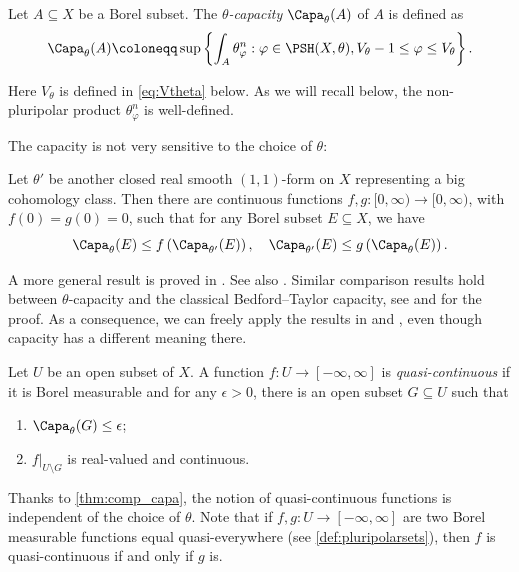 \begin{definition}\label{def:cap}
    Let $A\subseteq X$ be a Borel subset. The \emph{$\theta$-capacity} $\Capa_{\theta}(A)$\index{$\Capa_{\theta}$} of $A$ is defined as
    \[
    \Capa_{\theta}(A)\coloneqq \sup\left\{ \int_A\theta_{\varphi}^n : \varphi\in \PSH(X,\theta),V_{\theta}-1\leq \varphi\leq V_{\theta} \right\}.
    \]
\end{definition}
Here $V_{\theta}$ is defined in \eqref{eq:Vtheta} below. As we will recall below, the non-pluripolar product $\theta_{\varphi}^n$ is well-defined.

The capacity is not very sensitive to the choice of $\theta$:
\begin{theorem}\label{thm:comp_capa}
    Let $\theta'$ be another closed real smooth $(1,1)$-form on $X$ representing a big cohomology class. Then there are continuous functions $f,g\colon [0,\infty)\rightarrow [0,\infty)$, with $f(0)=g(0)=0$, such that for any Borel subset $E\subseteq X$, we have
    \[
    \Capa_{\theta}(E)\leq f\left( \Capa_{\theta'}(E)\right),\quad \Capa_{\theta'}(E)\leq g\left( \Capa_{\theta}(E)\right).
    \]
\end{theorem}
A more general result is proved in \cite{Lu21}. See also \cite[Theorem~16.9.8]{FPT}. Similar comparison results hold between $\theta$-capacity and the classical Bedford--Taylor capacity, see \cite[Section~9.2]{GZ17} and \cite[Proposition~16.9.9]{FPT} for the proof. As a consequence, we can freely apply the results in \cite[Section~4.2]{GZ17} and \cite[Sections~9.3--9.4]{FPT}, even though capacity has a different meaning there.

\begin{definition}\label{def:qc_fun}
Let $U$ be an open subset of $X$.
    A function $f\colon U\rightarrow [-\infty,\infty]$ is \emph{quasi-continuous} if it is Borel measurable and for any $\epsilon>0$, there is an open subset $G\subseteq U$ such that
    \begin{enumerate}
        \item\label{itm:def:qc_fun:1} $\Capa_{\theta}(G)\leq \epsilon$;
        \item\label{itm:def:qc_fun:2} $f|_{U\setminus G}$ is real-valued and continuous.
    \end{enumerate}
\end{definition}
Thanks to \cref{thm:comp_capa}, the notion of quasi-continuous functions is independent of the choice of $\theta$. Note that if $f,g\colon U\rightarrow [-\infty,\infty]$ are two Borel measurable functions equal quasi-everywhere (see \cref{def:pluripolarsets}), then $f$ is quasi-continuous if and only if $g$ is.

